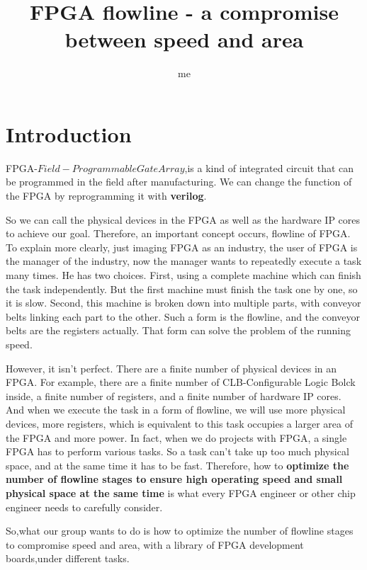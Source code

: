 \documentclass{article}
\title{FPGA flowline - a compromise between speed and area}
\author{me}
\begin{document}
\maketitle

\section{Introduction}

FPGA-\(Field-Programmable Gate Array\),is a kind of integrated circuit that can be programmed in the field after manufacturing.
We can change the function of the FPGA by reprogramming it with \textbf{verilog}.

So we can call the physical devices in the FPGA as well as the hardware IP cores to achieve our goal.
Therefore, an important concept occurs, flowline of FPGA.
To explain more clearly, just imaging FPGA as an industry, the user of FPGA is the manager of the industry,
now the manager wants to repeatedly execute a task many times. He has two choices. First, using a complete machine which can finish the task independently. 
But the first machine must finish the task one by one, so it is slow. Second, this machine is broken down into multiple parts, with conveyor belts linking each part to the other. 
Such a form is the flowline, and the conveyor belts are the registers actually. That form can solve the problem of the running speed.

However, it isn't perfect. There are a finite number of physical devices in an FPGA.
For example, there are a finite number of CLB-Configurable Logic Bolck inside, a finite number of registers, and a finite number of hardware IP cores.
And when we execute the task in a form of flowline, we will use more physical devices, more registers, which is equivalent to this task occupies a larger area of the FPGA and more power.
In fact, when we do projects with FPGA, a single FPGA has to perform various tasks. So a task can't take up too much physical space, and at the same time it has to be fast.
Therefore, how to \textbf{optimize the number of flowline stages to ensure high operating speed and small physical space at the same time} 
is what every FPGA engineer or other chip engineer needs to carefully consider.

So,what our group wants to do is how to optimize the number of flowline stages
to compromise speed and area, with a library of FPGA development boards,under different tasks.
\end{document}

